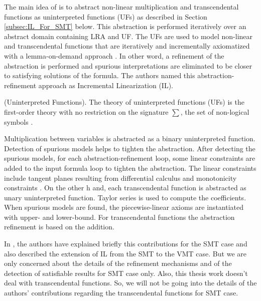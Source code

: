 \noindent The main idea of \cite{Cimatti:2018:ILS:3274693.3230639} is to abstract non-linear multiplication and transcendental functions as uninterpreted functions (UFs) as described in Section \ref{subsec:IL_For_SMT} below.
This abstraction is performed iteratively over an abstract domain containing LRA and UF.
The UFs are used to model non-linear and transcendental functions that are iteratively and incrementally axiomatized with a lemma-on-demand approach \cite{Cimatti:2018:ILS:3274693.3230639}.
In other word, a refinement of the abstraction is performed and spurious interpretations are eliminated to be closer to satisfying solutions of the formula.
The authors named this abstraction-refinement approach as Incremental Linearization (IL).\newline

\begin{definition}
    (Uninterpreted Functions).
    The theory of uninterpreted functions (UFs) is the first-order theory with no restriction on the signature $\sum$, the set of non-logical symbols \cite{Cimatti:2018:ILS:3274693.3230639}.
 \end{definition}
 
\noindent Multiplication between variables is abstracted as a binary uninterpreted function.
Detection of spurious models helps to tighten the abstraction.
After detecting the spurious models, for each abstraction-refinement loop, some linear constraints are added to the input formula loop to tighten the abstraction.
The linear constraints include tangent planes resulting from differential calculus and monotonicity constraints \cite{Cimatti:2018:ILS:3274693.3230639}.
On the other h and, each transcendental function is abstracted as unary uninterpreted function.
Taylor series is used to compute the coefficients.
When spurious models are found, the  piecewise-linear axioms are instantiated with upper- and lower-bound.
For transcendental functions the abstraction refinement is based on the addition.\newline

\noindent In \cite{Cimatti:2018:ILS:3274693.3230639}, the authors have explained briefly this contributions for the SMT case and also described the extension of IL from the SMT to the VMT case. 
But we are only concerned about the details of the refinement mechanisms and of the detection of satisfiable results for SMT case only.
Also, this thesis work doesn't deal with transcendental functions.
So, we will not be going into the details of the authors' contributions regarding the transcendental functions for SMT case.

